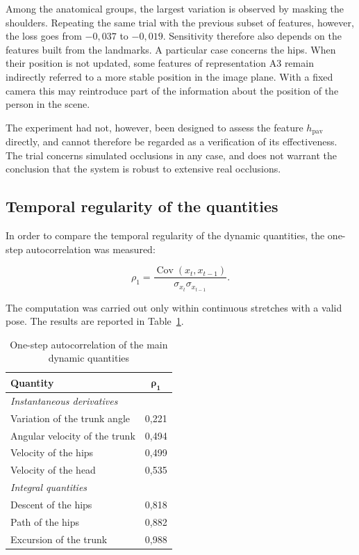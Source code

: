 Among the anatomical groups, the largest variation is observed by masking the shoulders.
Repeating the same trial with the previous subset of features, however, the loss goes from $-0{,}037$ to $-0{,}019$. Sensitivity therefore also depends on the features built from the landmarks.
A particular case concerns the hips. When their position is not updated, some features of representation A3 remain indirectly referred to a more stable position in the image plane. With a fixed camera this may reintroduce part of the information about the position of the person in the scene.

The experiment had not, however, been designed to assess the feature $h_{\text{pav}}$ directly, and cannot therefore be regarded as a verification of its effectiveness. The trial concerns simulated occlusions in any case, and does not warrant the conclusion that the system is robust to extensive real occlusions.

\subsection{Temporal regularity of the quantities}
\label{sec:autocorrelazione}

In order to compare the temporal regularity of the dynamic quantities, the one-step autocorrelation was measured:

\[
\rho_1 =
\frac{\operatorname{Cov}(x_t,x_{t-1})}
{\sigma_{x_t}\sigma_{x_{t-1}}}.
\]

The computation was carried out only within continuous stretches with a valid pose. The results are reported in Table~\ref{tab:autocorrelazione}.

\begin{table}[htbp]
\centering
\caption{One-step autocorrelation of the main dynamic quantities}
\label{tab:autocorrelazione}
\begin{tabular}{lc}
\toprule
\textbf{Quantity} & $\boldsymbol{\rho_1}$ \\
\midrule
\multicolumn{2}{l}{\emph{Instantaneous derivatives}} \\
\quad Variation of the trunk angle & 0,221 \\
\quad Angular velocity of the trunk & 0,494 \\
\quad Velocity of the hips & 0,499 \\
\quad Velocity of the head & 0,535 \\
\midrule
\multicolumn{2}{l}{\emph{Integral quantities}} \\
\quad Descent of the hips & 0,818 \\
\quad Path of the hips & 0,882 \\
\quad Excursion of the trunk & 0,988 \\
\bottomrule
\end{tabular}
\end{table}

